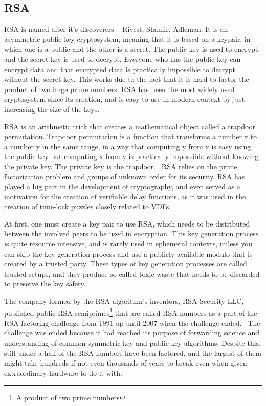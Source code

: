 \subsection{RSA}
RSA is named after it's discoverers – Rivest, Shamir, Adleman. It is an asymmetric public-key cryptosystem, meaning that it is based on a keypair, in which one is a public and the other is a secret. The public key is used to encrypt, and the secret key is used to decrypt. Everyone who has the public key can encrypt data and that encrypted data is practically impossible to decrypt without the secret key. This works due to the fact that it is hard to factor the product of two large prime numbers. RSA has been the most widely used cryptosystem since its creation, and is easy to use in modern context by just increasing the size of the keys.

RSA is an arithmetic trick that creates a mathematical object called a trapdoor permutation. Trapdoor permutation is a function that transforms a number x to a number y in the same range, in a way that computing y from x is easy using the public key but computing x from y is practically impossible without knowing the private key. The private key is the trapdoor.~\cite{Aumasson2018-nh} RSA relies on the prime factorization problem and groups of unknown order for its security. RSA has played a big part in the development of cryptography, and even served as a motivation for the creation of verifiable delay functions, as it was used in the creation of time-lock puzzles closely related to VDFs.

At first, one must create a key pair to use RSA, which needs to be distributed between the involved peers to be used in encryption. This key generation process is quite resource intensive, and is rarely used in ephemeral contexts, unless you can skip the key generation process and use a publicly available modulo that is created by a trusted party. These types of key generation processes are called trusted setups, and they produce so-called toxic waste that needs to be discarded to preserve the key safety.

The company formed by the RSA algorithm's inventors, RSA Security LLC, published public RSA semiprimes\footnote{A product of two prime numbers} that are called RSA numbers as a part of the RSA factoring challenge from 1991 up until 2007 when the challenge ended.~\cite{RSA_Laboratories2013-zk} The challenge was ended because it had reached its purpose of forwarding science and understanding of common symmetric-key and public-key algorithms. Despite this, still under a half of the RSA numbers have been factored, and the largest of them might take hundreds if not even thousands of years to break even when given extraordinary hardware to do it with.

